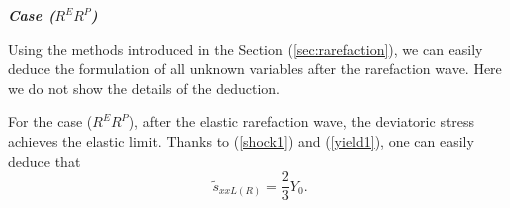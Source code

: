 \documentclass[review]{elsarticle}
\numberwithin{equation}{section}
\numberwithin{table}{section}
\begin{document}


	\emph{\textbf{Case ($R^{E}R^{P}$)}}

Using the methods introduced in  the Section (\ref{sec:rarefaction}), we can easily deduce the formulation of all unknown variables after the rarefaction wave. Here we do not show the details of the  deduction.


For the case ($R^{E}R^{P}$),  after the elastic rarefaction wave, the deviatoric stress achieves the elastic limit. Thanks to (\ref{shock1}) and (\ref{yield1}), one can easily deduce that
\begin{equation*}
\tilde{s}_{xxL(R)} = \frac{2}{3}Y_0.
\end{equation*}
\end{document}
